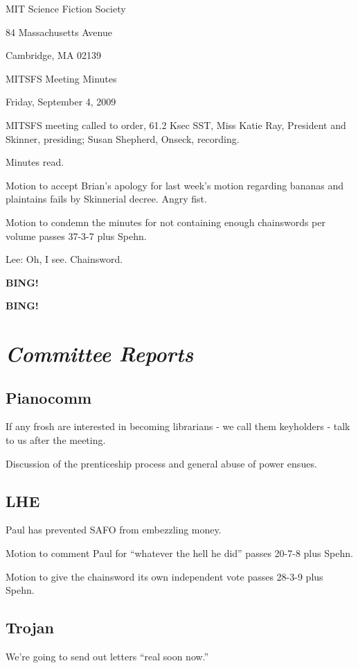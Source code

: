 \documentclass[10pt]{article}
\newcommand{\bing}{{\bf BING!} }
\newcommand{\goto}[1]{\bing \vskip 12pt \section*{{\em{#1}}}}
\newcommand{\ps}{ plus Spehn\xspace}
\begin{document}
\begin{center}

MIT Science Fiction Society

84 Massachusetts Avenue

Cambridge, MA 02139

\vspace{12pt}

MITSFS Meeting Minutes

Friday, September 4, 2009

\end{center}

\vspace{18pt}

\setlength{\parskip}{6pt}

\noindent
MITSFS meeting called to order, 61.2 Ksec SST,
Miss Katie Ray, President and Skinner, presiding; Susan Shepherd, Onseck, recording.

Minutes read.

Motion to accept Brian's apology for last week's motion regarding bananas and plaintains fails by Skinnerial decree. Angry fist.

Motion to condemn the minutes for not containing enough chainswords per volume passes 37-3-7\ps.

Lee: Oh, I see. Chainsword.

\bing

\goto{Committee Reports}

\subsection*{Pianocomm}
If any frosh are interested in becoming librarians - we call them keyholders - talk to us after the meeting. 

Discussion of the prenticeship process and general abuse of power ensues.

\subsection*{LHE}
Paul has prevented SAFO from embezzling money.

Motion to comment Paul for ``whatever the hell he did'' passes 20-7-8\ps.

Motion to give the chainsword its own independent vote passes 28-3-9\ps. 

\subsection*{Trojan}
We're going to send out letters ``real soon now.''
\end{document}
